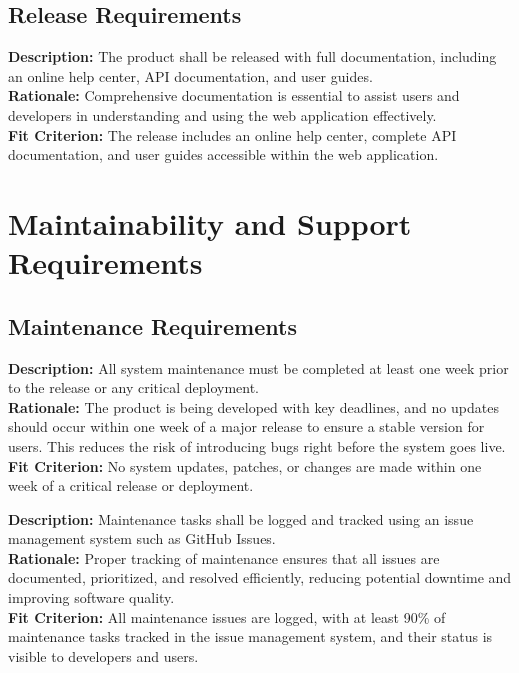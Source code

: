 \documentclass[12pt]{article}
\begin{document}
\vspace{0.5cm}

\subsection{Release Requirements}

\begin{tcolorbox}[title=OER1]
\textbf{Description:} The product shall be released with full documentation, including an online help center, API documentation, and user guides. \\
\textbf{Rationale:} Comprehensive documentation is essential to assist users and developers in understanding and using the web application effectively. \\
\textbf{Fit Criterion:} The release includes an online help center, complete API documentation, and user guides accessible within the web application.
\end{tcolorbox}

\vspace{0.5cm}

\section{Maintainability and Support Requirements}

\subsection{Maintenance Requirements}

\begin{tcolorbox}[title=MSM1]
\textbf{Description:} All system maintenance must be completed at least one week prior to the release or any critical deployment. \\
\textbf{Rationale:} The product is being developed with key deadlines, and no updates should occur within one week of a major release to ensure a stable version for users. This reduces the risk of introducing bugs right before the system goes live. \\
\textbf{Fit Criterion:} No system updates, patches, or changes are made within one week of a critical release or deployment.
\end{tcolorbox}

\vspace{0.5cm}

\begin{tcolorbox}[title=MSM2]
\textbf{Description:} Maintenance tasks shall be logged and tracked using an issue management system such as GitHub Issues. \\
\textbf{Rationale:} Proper tracking of maintenance ensures that all issues are documented, prioritized, and resolved efficiently, reducing potential downtime and improving software quality. \\
\textbf{Fit Criterion:} All maintenance issues are logged, with at least 90\% of maintenance tasks tracked in the issue management system, and their status is visible to developers and users.
\end{tcolorbox}
\end{document}
